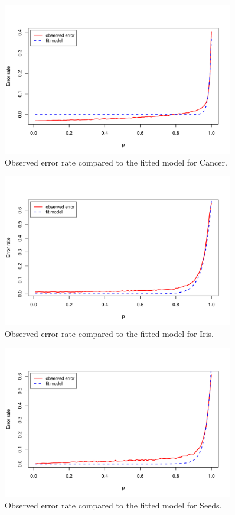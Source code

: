 \documentclass{article}
\begin{document}
\begin{figure}
 \centering
 \includegraphics[width=0.9\textwidth]{./figures/cancer.pdf}
 \caption{Observed error rate compared to the fitted model for Cancer.}
 \label{fig:cancer}
\end{figure}

\begin{figure}
 \centering
 \includegraphics[width=0.9\textwidth]{./figures/iris.pdf}
 \caption{Observed error rate compared to the fitted model for Iris.}
 \label{fig:iris}
\end{figure}

\begin{figure}
 \centering
 \includegraphics[width=0.9\textwidth]{./figures/seeds.pdf}
 \caption{Observed error rate compared to the fitted model for Seeds.}
 \label{fig:seeds}
\end{figure}
\end{document}
